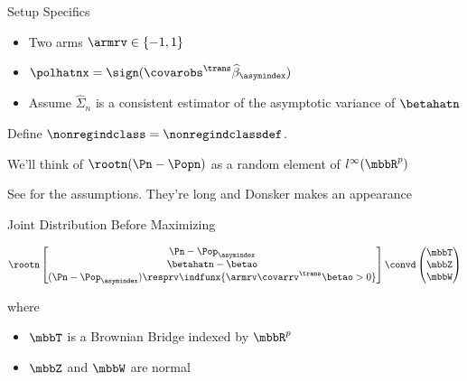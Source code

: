 \documentclass[aspectratio=169, professionalfonts]{beamer}
\begin{document}
\begin{frame}{Setup Specifics}
	\begin{itemize}
		\item	Two arms $\armrv \in \{-1, 1\}$
		      \vfill

		\item $\polhatnx = \sign(\covarobs^{\trans}\widehat{\beta}_{\asymindex})$
		      \vfill

		\item Assume $\widehat{\Sigma}_n$ is a consistent estimator of the asymptotic variance of $\betahatn$
	\end{itemize}
	\vfill \pause

	Define $\nonregindclass = \nonregindclassdef$.
	\vfill

	We'll think of $\rootn(\Pn - \Popn)$ as a random element of $l^{\infty}(\mbbR^p)$
	\vfill

	\footnotesize
	See  for the assumptions. They're long and
	Donsker makes an appearance
\end{frame}

\begin{frame}{Joint Distribution Before Maximizing}

	\begin{displaymath}
		\rootn \begin{bmatrix}\Pn - \Pop_{\asymindex} \\
			\betahatn - \betao      \\
			(\Pn - \Pop_{\asymindex})\resprv \indfunx{\armrv \covarrv^{\trans}\betao
				> 0}\end{bmatrix} \convd \begin{pmatrix} \mbbT \\ \mbbZ \\
			\mbbW\end{pmatrix}
	\end{displaymath}

	where

	\begin{itemize}
		\item $\mbbT$ is a Brownian Bridge indexed by $\mbbR^p$
		\item $\mbbZ$ and $\mbbW$ are normal
	\end{itemize}
\end{frame}
\end{document}
